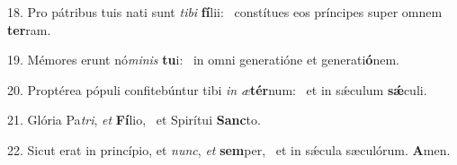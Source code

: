 18. Pro pátribus tuis nati sunt \textit{ti}\textit{bi} \textbf{fí}lii: \ast\  constítues eos príncipes super omnem \textbf{ter}ram.\

19. Mémores erunt nó\textit{mi}\textit{nis} \textbf{tu}i: \ast\  in omni generatióne et generati\textbf{ó}nem.\

20. Proptérea pópuli confitebúntur tibi \textit{in} \textit{æ}\textbf{tér}num: \ast\  et in sǽculum \textbf{sǽ}culi.\

21. Glória Pa\textit{tri}, \textit{et} \textbf{Fí}lio, \ast\  et Spirítui \textbf{Sanc}to.\

22. Sicut erat in princípio, et \textit{nunc}, \textit{et} \textbf{sem}per, \ast\  et in sǽcula sæculórum. \textbf{A}men.\

